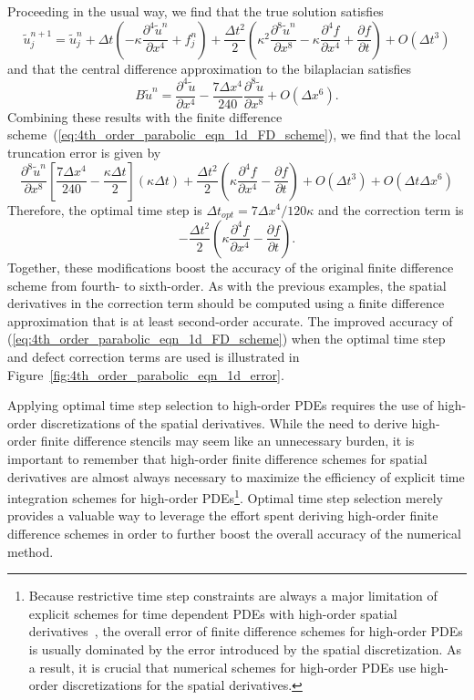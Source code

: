 \documentclass[fleqn,12pt,twoside]{article}
\newcommand{\beq}{\begin{equation}}
\newcommand{\eeq}{\end{equation}}
\def\pt{\partial t}
\def\px{\partial x}
\def\tu{\tilde{u}}
\def\dt{\Delta t}
\def\dx{\Delta x}
\def\dto{\dt_{opt}}
\begin{document}
Proceeding in the usual way, we find that the true solution satisfies
\beq
  \tu^{n+1}_j = \tu^{n}_j 
  + \dt \left( -\kappa \frac{\partial^4 \tu^n}{\px^4}  
             + f^n_j
        \right)
  + \frac{\dt^2}{2} 
    \left(
      \kappa^2 \frac{\partial^8 \tu^n}{\px^8} 
    - \kappa \frac{\partial^4 f}{\px^4} 
    + \frac{\partial f}{\pt}
    \right)
  + O \left( \dt^3 \right)
  \label{eq:4th_order_parabolic_eqn_1d_time_err}
\eeq
and that the central difference approximation to the bilaplacian satisfies
\beq
  B \tu^n = \frac{\partial^4 \tu}{\px^4} 
  - \frac{7 \dx^4}{240} 
    \frac{\partial^8 \tu}{\px^8} 
  + O(\dx^6)
  \label{eq:4th_order_parabolic_eqn_1d_space_err}.
\eeq
Combining these results with the finite difference 
scheme~(\ref{eq:4th_order_parabolic_eqn_1d_FD_scheme}), we find that the
local truncation error is given by
\beq
     \frac{\partial^8 \tu^n}{\px^8} 
    \left[ \frac{7 \dx^4}{240} - \frac{\kappa \dt}{2}  \right] (\kappa \dt)
    + \frac{\dt^2}{2} 
        \left( \kappa \frac{\partial^4 f}{\px^4} 
             - \frac{\partial f}{\pt}
        \right)
    + O(\dt^3) + O(\dt \dx^6)
  \label{eq:4th_order_parabolic_eqn_1d_err_eqn}
\eeq
Therefore, the optimal time step is $\dto = 7 \dx^4/120\kappa$ and the 
correction term is 
\beq
  - \frac{\dt^2}{2} 
      \left( \kappa \frac{\partial^4 f}{\px^4} 
           - \frac{\partial f}{\pt}
      \right).
\eeq
Together, these modifications boost the accuracy of the original
finite difference scheme from fourth- to sixth-order.
As with the previous examples, the spatial derivatives in the 
correction term should be computed using a finite difference approximation 
that is at least second-order accurate.  
The improved accuracy of (\ref{eq:4th_order_parabolic_eqn_1d_FD_scheme}) 
when the optimal time step and defect correction terms are used is 
illustrated in Figure~\ref{fig:4th_order_parabolic_eqn_1d_error}. 

Applying optimal time step selection to high-order PDEs requires the use of 
high-order discretizations of the spatial derivatives.  While the need to 
derive high-order finite difference stencils may seem like an unnecessary 
burden, it is important to remember that high-order finite difference schemes 
for spatial derivatives are almost always necessary to maximize the efficiency 
of explicit time integration schemes for high-order 
PDEs\footnote{Because restrictive time step constraints are always a major 
limitation of explicit schemes for time dependent PDEs with high-order spatial 
derivatives~\cite{gko_book,greer_2006}, 
the overall error of finite difference schemes for high-order PDEs is usually 
dominated by the error introduced by the spatial discretization.  As a result, 
it is crucial that numerical schemes for high-order PDEs use high-order 
discretizations for the spatial derivatives.}.
Optimal time step selection merely provides a valuable way to leverage the 
effort spent deriving high-order finite difference schemes in order to further 
boost the overall accuracy of the numerical method.
\end{document}
